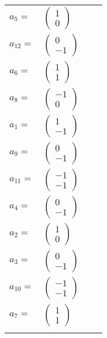 \documentclass[1p]{elsarticle_modified}
\theoremstyle{definition}
\begin{document}
\begin{tabular}{m{7pt} m{180pt} m{7pt} m{180pt} }
\flushright $a_{5}=$&$\begin{pmatrix}1\\0\end{pmatrix}$ \\
\flushright $a_{12}=$&$\begin{pmatrix}0\\-1\end{pmatrix}$ \\
\flushright $a_{6}=$&$\begin{pmatrix}1\\1\end{pmatrix}$ \\
\flushright $a_{8}=$&$\begin{pmatrix}-1\\0\end{pmatrix}$ \\
\flushright $a_{1}=$&$\begin{pmatrix}1\\-1\end{pmatrix}$ \\
\flushright $a_{9}=$&$\begin{pmatrix}0\\-1\end{pmatrix}$ \\
\flushright $a_{11}=$&$\begin{pmatrix}-1\\-1\end{pmatrix}$ \\
\flushright $a_{4}=$&$\begin{pmatrix}0\\-1\end{pmatrix}$ \\
\flushright $a_{2}=$&$\begin{pmatrix}1\\0\end{pmatrix}$ \\
\flushright $a_{3}=$&$\begin{pmatrix}0\\-1\end{pmatrix}$ \\
\flushright $a_{10}=$&$\begin{pmatrix}-1\\-1\end{pmatrix}$ \\
\flushright $a_{7}=$&$\begin{pmatrix}1\\1\end{pmatrix}$\\&\end{tabular}
\end{document}
